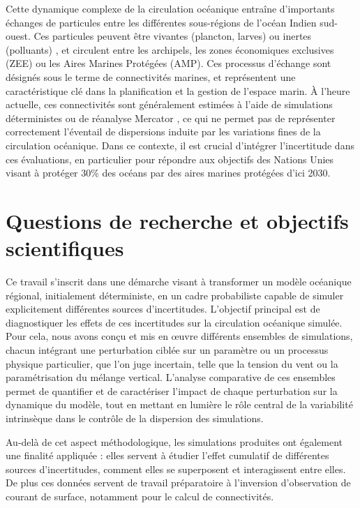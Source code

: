 Cette dynamique complexe de la circulation océanique entraîne d’importants échanges de particules entre les différentes sous-régions de l’océan Indien sud-ouest. Ces particules peuvent être vivantes (plancton, larves) ou inertes (polluants) \cite{murphy_global_2021}, et circulent entre les archipels, les zones économiques exclusives (ZEE) ou les Aires Marines Protégées (AMP). Ces processus d’échange sont désignés sous le terme de connectivités marines, et représentent une caractéristique clé dans la planification et la gestion de l'espace marin. À l’heure actuelle, ces connectivités sont généralement estimées à l’aide de simulations déterministes ou de réanalyse Mercator \cite{maina_aligning_2020} , ce qui ne permet pas de représenter correctement l'éventail de dispersions induite par les variations fines de la circulation océanique. Dans ce contexte, il est crucial d’intégrer l’incertitude dans ces évaluations, en particulier pour répondre aux objectifs des Nations Unies visant à protéger 30\% des océans par des aires marines protégées d’ici 2030.

\section{Questions de recherche et objectifs scientifiques}

Ce travail s’inscrit dans une démarche visant à transformer un modèle océanique régional, initialement déterministe, en un cadre probabiliste capable de simuler explicitement différentes sources d’incertitudes. L’objectif principal est de diagnostiquer les effets de ces incertitudes sur la circulation océanique simulée. Pour cela, nous avons conçu et mis en œuvre différents ensembles de simulations, chacun intégrant une perturbation ciblée sur un paramètre ou un processus physique particulier, que l'on juge incertain, telle que la tension du vent ou la paramétrisation du mélange vertical. L’analyse comparative de ces ensembles permet de quantifier et de caractériser l’impact de chaque perturbation sur la dynamique du modèle, tout en mettant en lumière le rôle central de la variabilité intrinsèque dans le contrôle de la dispersion des simulations.

Au-delà de cet aspect méthodologique, les simulations produites ont également une finalité appliquée : elles servent à étudier l'effet cumulatif de différentes sources d'incertitudes, comment elles se superposent et interagissent entre elles. De plus ces données servent de travail préparatoire à l'inversion d'observation de courant de surface, notamment pour le calcul de connectivités.





